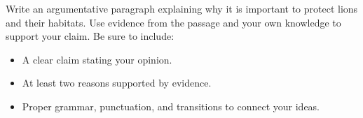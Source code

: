 \documentclass[12pt]{article}
\begin{document}
\begin{tcolorbox}[colframe=black!50, colback=white, title=Question 10: Writing Performance Task]
Write an argumentative paragraph explaining why it is important to protect lions and their habitats. Use evidence from the passage and your own knowledge to support your claim. Be sure to include:  
\begin{itemize}
    \item A clear claim stating your opinion.  
    \item At least two reasons supported by evidence.  
    \item Proper grammar, punctuation, and transitions to connect your ideas.  
\end{itemize}

\vspace{2em}
\\[0.8cm] \underline{\hspace{15.8cm}}  
    \\[0.8cm] \underline{\hspace{15.8cm}}  
    \\[0.8cm] \underline{\hspace{15.8cm}}  
    \\[0.8cm] \underline{\hspace{15.8cm}}  
    \\[0.8cm] \underline{\hspace{15.8cm}}  
    \\[0.8cm] \underline{\hspace{15.8cm}}  
       \\[0.8cm] \underline{\hspace{15.8cm}}  
  
\end{tcolorbox}
\end{document}
